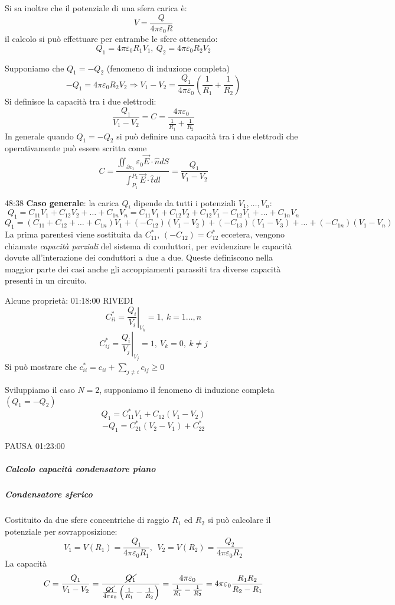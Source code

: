 Si sa inoltre che il potenziale di una sfera carica è:
$$
V = \frac{Q}{4 \pi \varepsilon_0 R}
$$
il calcolo si può effettuare per entrambe le sfere ottenendo:
$$
Q_1 = 4 \pi \varepsilon_0 R_1 V_1,\ Q_2 = 4 \pi \varepsilon_0 R_2 V_2
$$

Supponiamo che $Q_1 = -Q_2$ (fenomeno di induzione completa)
$$
-Q_1 = 4 \pi \varepsilon_0 R_2 V_2 \Rightarrow V_1 - V_2 = \frac{Q_1}{4 \pi \varepsilon_0}
\left(\frac{1}{R_1} + \frac{1}{R_2}\right)
$$
Si definisce la capacità tra i due elettrodi:
$$
\frac{Q_1}{V_1 - V_2} = C = \frac{4 \pi \varepsilon_0}{\frac{1}{R_1}+\frac{1}{R_2}}
$$
In generale quando $Q_1 = - Q_2$ si può definire una capacità tra i due elettrodi che operativamente
può essere scritta come 
$$
C = \frac{\iint_{\partial c_1} \varepsilon_0 \vec{E}\cdot\hat{n}dS} {\int_{P_1}^{P_2}\vec{E}\cdot\hat{t} dl} = \frac{Q_1}{V_1 - V_2}
$$

48:38
\textbf{Caso generale}: la carica $Q_i$ dipende da tutti i potenziali $V_1, \ldots ,V_n$:
$$
Q_1 = C_{11}V_1 + C_{12}V_2 + \ldots + C_{1n}V_n = C_{11}V_1 + C_{12}V_2 + C_{12}V_1 - C_{12} V_1 +
... + C_{1n}V_n
$$
$$
Q_1 = \left(C_{11}+C_{12} + \ldots + C_{1n}\right) V_1 + (-C_{12})(V_1-V_2) + (-C_{13})(V_1-V_3)
+ \ldots + (-C_{1n})(V_1-V_n)
$$
La prima parentesi viene sostituita da $C_{11}^*$, $(-C_{12}) = C_{12}^*$ eccetera, vengono chiamate
\textit{capacità parziali} del sistema di conduttori, per evidenziare le capacità 
dovute all'interazione dei conduttori a due a due.
Queste definiscono nella maggior parte dei casi anche gli accoppiamenti parassiti
tra diverse capacità presenti in un circuito.

Alcune proprietà: 01:18:00 RIVEDI
$$
C_{ii}^* = \left.\frac{Q_i}{V_i}\right|_{V_k} = 1,\ k=1...,n
$$
$$
C_{ij}^* = \left.\frac{Q_i}{V_j}\right|_{V_j}=1,\ V_k = 0,\ k \neq j
$$
Si può mostrare che $c_{ii}^* =c_{ii} + \sum_{j\neq i}c_{ij} \geq 0$


Sviluppiamo il caso $N = 2$, supponiamo il fenomeno di induzione completa $(Q_1 = -Q_2)$
$$
Q_1 = C_{11}^*V_1 + C_{12}(V_1-V_2)
$$
$$
-Q_1 = C_{21}^*(V_2-V_1) + C_{22}^*
$$

PAUSA 01:23:00

\subparagraph{Calcolo capacità condensatore piano}


\subparagraph{Condensatore sferico}
Costituito da due sfere concentriche di raggio $R_1$ ed $R_2$
si può calcolare il potenziale per sovrapposizione:
$$
V_1 = V(R_1) = \frac{Q_1}{4\pi \varepsilon_0 R_1},\ \ V_2 = V(R_2) = \frac{Q_2}{4 \pi \varepsilon_0 R_2}
$$
La capacità
$$
C = \frac{Q_1}{V_1 - V_2} = \frac{\cancel{Q_1}}{\frac{\cancel{Q_1}}{4 \pi \varepsilon_0}\left(\frac{1}{R_1}-\frac{1}{R_2}\right)} = \frac{4 \pi \varepsilon_0}{\frac{1}{R_1}-\frac{1}{R_2}} = 4 \pi \varepsilon_0 \frac{R_1 R_2}{R_2 - R_1}
$$

